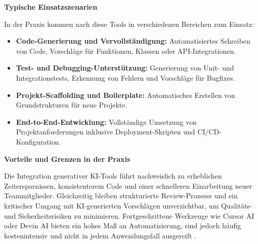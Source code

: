 \vspace{1em}
\noindent
\textbf{Typische Einsatzszenarien}

In der Praxis kommen nach \cite{donvir_role_2024} diese Tools in verschiedenen
Bereichen zum Einsatz:
\begin{itemize}
    \item \textbf{Code-Generierung und Vervollständigung:} Automatisiertes Schreiben von Code, Vorschläge für Funktionen, Klassen oder API-Integrationen.
    \item \textbf{Test- und Debugging-Unterstützung:} Generierung von Unit- und Integrationstests, Erkennung von Fehlern und Vorschläge für Bugfixes.
    \item \textbf{Projekt-Scaffolding und Boilerplate:} Automatisches Erstellen von Grundstrukturen für neue Projekte.
    \item \textbf{End-to-End-Entwicklung:} Vollständige Umsetzung von Projektanforderungen inklusive Deployment-Skripten und CI/CD-Konfiguration.
\end{itemize}

\vspace{1em}
\noindent
\textbf{Vorteile und Grenzen in der Praxis}

Die Integration generativer KI-Tools führt nachweislich zu erheblichen
Zeitersparnissen, konsistenterem Code und einer schnelleren Einarbeitung neuer
Teammitglieder. Gleichzeitig bleiben strukturierte Review-Prozesse und ein
kritischer Umgang mit KI-generierten Vorschlägen unverzichtbar, um Qualitäts-
und Sicherheitsrisiken zu minimieren. Fortgeschrittene Werkzeuge wie Cursor AI
oder Devin AI bieten ein hohes Maß an Automatisierung, sind jedoch häufig
kostenintensiv und nicht in jedem Anwendungsfall ausgereift
\cite{donvir_role_2024}.

